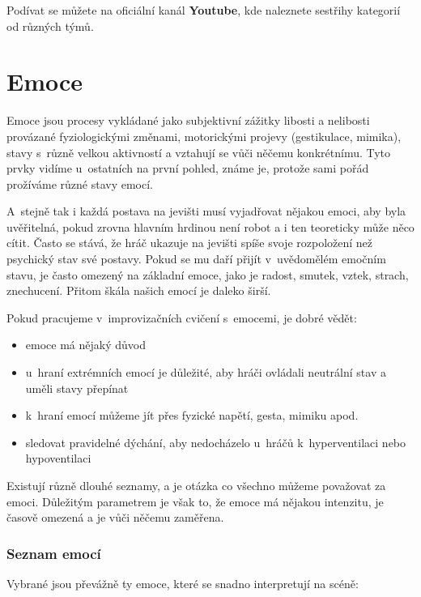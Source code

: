 Podívat se můžete na oficiální kanál \textbf{Youtube}, kde naleznete sestřihy kategorií od různých týmů. 
\needspace{5cm} \section{Emoce} \label{emoce} Emoce jsou procesy vykládané jako subjektivní zážitky libosti a nelibosti provázané fyziologickými změnami, motorickými projevy (gestikulace, mimika), stavy s~různě velkou aktivností a vztahují se vůči něčemu konkrétnímu. Tyto prvky vidíme u~ostatních na první pohled, známe je, protože sami pořád prožíváme různé stavy emocí. 
 
A~stejně tak i každá postava na jevišti musí vyjadřovat nějakou emoci, aby byla uvěřitelná, pokud zrovna hlavním hrdinou není robot a i ten teoreticky může něco cítit. Často se stává, že hráč ukazuje na jevišti spíše svoje rozpoložení než psychický stav své postavy. Pokud se mu daří přijít v~uvědomělém emočním stavu, je často omezený na základní emoce, jako je radost, smutek, vztek, strach, znechucení. Přitom škála našich emocí je daleko širší. 
 
Pokud pracujeme v~improvizačních cvičení s~emocemi, je dobré vědět: 
\begin{itemize}
\item  emoce má nějaký důvod
\item  u~hraní extrémních emocí je důležité, aby hráči ovládali neutrální stav a uměli stavy přepínat
\item  k~hraní emocí můžeme jít přes fyzické napětí, gesta, mimiku apod.
\item  sledovat pravidelné dýchání, aby nedocházelo u~hráčů k~hyperventilaci nebo hypoventilaci
\end{itemize}
 
Existují různě dlouhé seznamy, a je otázka co všechno můžeme považovat za emoci. 
Důležitým parametrem je však to, že emoce má nějakou intenzitu, je časově omezená a je vůči něčemu zaměřena. 
 
\subsubsection{Seznam emocí} Vybrané jsou převážně ty emoce, které se snadno interpretují na scéně: 
 
